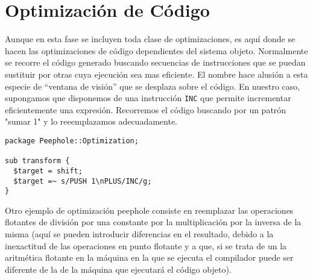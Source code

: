\section{Optimización de Código}
Aunque en esta fase se incluyen toda clase de optimizaciones,
es aquí donde se hacen las optimizaciones de código dependientes
del sistema objeto. Normalmente se
recorre el código generado buscando secuencias 
de instrucciones que se puedan sustituir por otras cuya 
ejecución sea mas eficiente.
El nombre  hace alusión a esta especie de
``ventana
de visión'' que se desplaza sobre el código.  En nuestro caso,
supongamos que disponemos de una instrucción \verb|INC| que permite
incrementar eficientemente una expresión. Recorremos el código buscando
por un patrón "sumar 1" y lo reeemplazamos adecuadamente.

\begin{verbatim}
package Peephole::Optimization;

sub transform {
  $target = shift;
  $target =~ s/PUSH 1\nPLUS/INC/g;
}
\end{verbatim}

Otro ejemplo de optimización peephole consiste en reemplazar las operaciones
flotantes de división por una constante por la multiplicación por la inversa
de la misma (aquí se pueden introducir diferencias en el resultado, debido
a la inexactitud de las operaciones en punto flotante y a que, si
se trata de un  la aritmética 
flotante en la máquina en la que se ejecuta el compilador puede ser diferente
de la de la máquina que ejecutará el código objeto).

